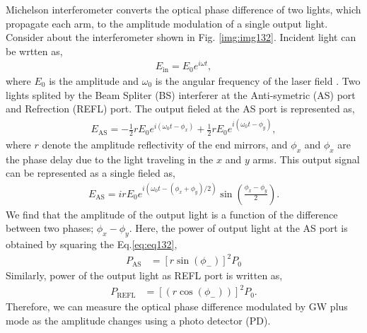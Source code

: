 Michelson interferometer converts the optical phase difference of two lights, which propagate each arm, to the amplitude modulation of a single output light. Consider about the interferometer shown in Fig. \ref{img:img132}. Incident light can be wrtten as,
\begin{eqnarray}
  E_{\mathrm{in}} = E_{0} e^{i\omega{t}},
\end{eqnarray}
where $E_0$ is the amplitude and $\omega_0$ is the angular frequency of the laser field
. Two lights splited by the Beam Spliter (BS) interferer at the Anti-symetric (AS) port and Refrection (REFL) port. The output fieled at the AS port is represented as,
\begin{eqnarray}
  E_{\mathrm{AS}} = -\frac{1}{2}rE_{0} e^{i\left(\omega_{0} t-\phi_{x}\right)}+\frac{1}{2}r E_{0} e^{i\left(\omega_{0} t-\phi_{y}\right)},
\end{eqnarray}
where $r$ denote the amplitude reflectivity of the end mirrors, and $\phi_{x}$ and $\phi_{x}$ are the phase delay due to the light traveling in the $x$ and $y$ arms. This output signal can be represented as a single fieled as,
\begin{eqnarray}
E_{\mathrm{AS}} = i r E_{0} e^{i\left(\omega_{0} t-\left(\phi_{x}+\phi_{y}\right) / 2\right)} \sin \left(\frac{\phi_{x}-\phi_{y}}{2}\right). \label{eq:eq132}
\end{eqnarray} 
We find that the amplitude of the output light is a function of the difference between two phases; $\phi_{x}-\phi_{y}$. Here, the power of output light at the AS port is obtained by squaring the Eq.\ref{eq:eq132}, 
\begin{eqnarray}
  P_{\mathrm{AS}} &=\left[r\sin({\phi_{-}})\right]^2P_0  \label{eq:eq133}
\end{eqnarray}
Similarly, power of the output light as REFL port is written as,
\begin{eqnarray}
  P_{\mathrm{REFL}} &=\left[(r\cos({\phi_{-}}))\right]^2P_0. \label{eq:eq134}
\end{eqnarray}
Therefore, we can measure the optical phase difference modulated by GW plus mode as the amplitude changes using a photo detector (PD).

